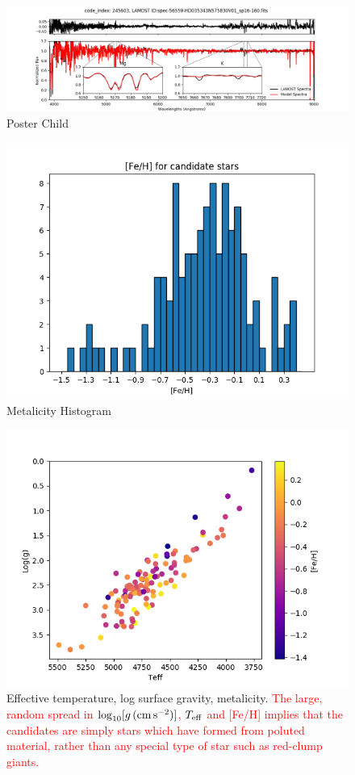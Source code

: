 \documentclass[a4paper,fleqn,usenatbib]{mnras}
\newcommand{\todo}[1]{\textcolor{red}{#1}}
\newcommand{\teff}{T_{\rm eff}}
\newcommand{\logg}{\log_{10}[g\,({\rm cm\,s}^{-2})]}
\begin{document}
\begin{figure}
	\includegraphics[width=\columnwidth]{posterchildof13.png}
    \caption{Poster Child}
    \label{posterchild}
\end{figure}

\begin{figure}
	\includegraphics[width=\columnwidth]{histof113.png}
    \caption{Metalicity Histogram}
    \label{mhist}
\end{figure}


\begin{figure}
	\includegraphics[width=\columnwidth]{loggteffof113.png}
    \caption{Effective temperature, log surface gravity, metalicity. \todo{The large, random spread in $\logg$, $\teff$ and [Fe/H] implies that the candidates are simply stars which have formed from poluted material, rather than any special type of star such as red-clump giants.}}
    \label{tefflogg}
\end{figure}
\end{document}
